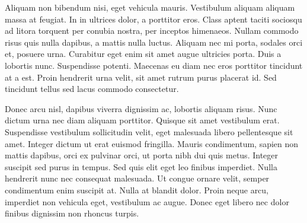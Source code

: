 Aliquam non bibendum nisi, eget vehicula mauris. Vestibulum aliquam aliquam massa at feugiat. In in ultrices dolor, a porttitor eros. Class aptent taciti sociosqu ad litora torquent per conubia nostra, per inceptos himenaeos. Nullam commodo risus quis nulla dapibus, a mattis nulla luctus. Aliquam nec mi porta, sodales orci et, posuere urna. Curabitur eget enim sit amet augue ultricies porta. Duis a lobortis nunc. Suspendisse potenti. Maecenas eu diam nec eros porttitor tincidunt at a est. Proin hendrerit urna velit, sit amet rutrum purus placerat id. Sed tincidunt tellus sed lacus commodo consectetur.

Donec arcu nisl, dapibus viverra dignissim ac, lobortis aliquam risus. Nunc dictum urna nec diam aliquam porttitor. Quisque sit amet vestibulum erat. Suspendisse vestibulum sollicitudin velit, eget malesuada libero pellentesque sit amet. Integer dictum ut erat euismod fringilla. Mauris condimentum, sapien non mattis dapibus, orci ex pulvinar orci, ut porta nibh dui quis metus. Integer suscipit sed purus in tempus. Sed quis elit eget leo finibus imperdiet. Nulla hendrerit nunc nec consequat malesuada. Ut congue ornare velit, semper condimentum enim suscipit at. Nulla at blandit dolor. Proin neque arcu, imperdiet non vehicula eget, vestibulum ac augue. Donec eget libero nec dolor finibus dignissim non rhoncus turpis.


\cleardoublepage
\tableofcontents %


\cleardoublepage
\listoffigures %

\cleardoublepage
\listoftables %

